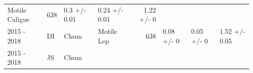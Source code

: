 \documentclass[fleqn,10pt]{wlpeerj} %
\begin{document}
\begin{longtable}[]{@{}llllrlll@{}}
\begin{minipage}[t]{0.11\columnwidth}
Motile Caligus\strut
\end{minipage} & \begin{minipage}[t]{0.04\columnwidth}\raggedleft\strut
638\strut
\end{minipage} & \begin{minipage}[t]{0.14\columnwidth}\raggedright\strut
0.3 +/- 0.01\strut
\end{minipage} & \begin{minipage}[t]{0.14\columnwidth}\raggedright\strut
0.24 +/- 0.01\strut
\end{minipage} & \begin{minipage}[t]{0.14\columnwidth}\raggedright\strut
1.22 +/- 0\strut
\end{minipage}\tabularnewline
\begin{minipage}[t]{0.09\columnwidth}\raggedright\strut
2015 - 2018\strut
\end{minipage} & \begin{minipage}[t]{0.06\columnwidth}\raggedright\strut
DI\strut
\end{minipage} & \begin{minipage}[t]{0.06\columnwidth}\raggedright\strut
Chum\strut
\end{minipage} & \begin{minipage}[t]{0.11\columnwidth}\raggedright\strut
Motile Lep\strut
\end{minipage} & \begin{minipage}[t]{0.04\columnwidth}\raggedleft\strut
638\strut
\end{minipage} & \begin{minipage}[t]{0.14\columnwidth}\raggedright\strut
0.08 +/- 0\strut
\end{minipage} & \begin{minipage}[t]{0.14\columnwidth}\raggedright\strut
0.05 +/- 0\strut
\end{minipage} & \begin{minipage}[t]{0.14\columnwidth}\raggedright\strut
1.52 +/- 0.05\strut
\end{minipage}\tabularnewline
\begin{minipage}[t]{0.09\columnwidth}\raggedright\strut
2015 - 2018\strut
\end{minipage} & \begin{minipage}[t]{0.06\columnwidth}\raggedright\strut
JS\strut
\end{minipage} & \begin{minipage}[t]{0.06\columnwidth}\raggedright\strut
Chum\strut
\end{minipage} & \begin{minipage}[t]{0.11\columnwidth}\raggedright\strut

\end{minipage}
\end{longtable}
\end{document}
